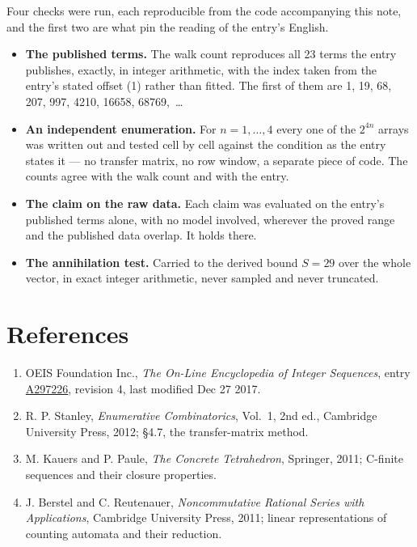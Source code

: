 \documentclass[11pt]{article}
\theoremstyle{definition}
\begin{document}
Four checks were run, each reproducible from the code accompanying this note, and the first two are what pin the reading of the entry's English.

\begin{itemize}

\item {\bfseries The published terms.} The walk count reproduces all 23 terms the entry publishes, exactly, in integer arithmetic, with the index taken from the entry's stated offset (1) rather than fitted. The first of them are 1, 19, 68, 207, 997, 4210, 16658, 68769,~\dots

\item {\bfseries An independent enumeration.} For $n = 1,\dots,4$ every one of the $2^{4n}$ arrays was written out and tested cell by cell against the condition as the entry states it --- no transfer matrix, no row window, a separate piece of code. The counts agree with the walk count and with the entry.

\item {\bfseries The claim on the raw data.} Each claim was evaluated on the entry's published terms alone, with no model involved, wherever the proved range and the published data overlap. It holds there.

\item {\bfseries The annihilation test.} Carried to the derived bound $S = 29$ over the whole vector, in exact integer arithmetic, never sampled and never truncated.

\end{itemize}

\section{References}

\begin{enumerate}

\item OEIS Foundation Inc., \emph{The On-Line Encyclopedia of Integer Sequences}, entry \href{https://oeis.org/A297226}{A297226}, revision 4, last modified Dec 27 2017.

\item R. P. Stanley, \emph{Enumerative Combinatorics}, Vol.~1, 2nd ed., Cambridge University Press, 2012; \S4.7, the transfer-matrix method.

\item M. Kauers and P. Paule, \emph{The Concrete Tetrahedron}, Springer, 2011; C-finite sequences and their closure properties.

\item J. Berstel and C. Reutenauer, \emph{Noncommutative Rational Series with Applications}, Cambridge University Press, 2011; linear representations of counting automata and their reduction.

\end{enumerate}
\end{document}
